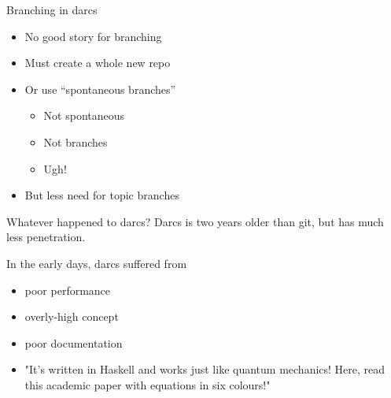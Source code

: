 \documentclass[pdf]{prosper}
\begin{document}
\begin{slide}{Branching in darcs}
\begin{itemize}
\item No good story for branching
\item Must create a whole new repo
\item Or use ``spontaneous branches''
\begin{itemize}
\item Not spontaneous
\item Not branches
\item Ugh!
\end{itemize}
\item But less need for topic branches
\end{itemize}
\end{slide}




\begin{slide}{Whatever happened to darcs?}
Darcs is two years older than git, but has much less penetration.

In the early days, darcs suffered from
\begin{itemize}
\item poor performance
\item overly-high concept
\item poor documentation
\item "It's written in Haskell and works just like quantum mechanics! Here,
read this academic paper with equations in six colours!"
\end{itemize}
\end{slide}
\end{document}
